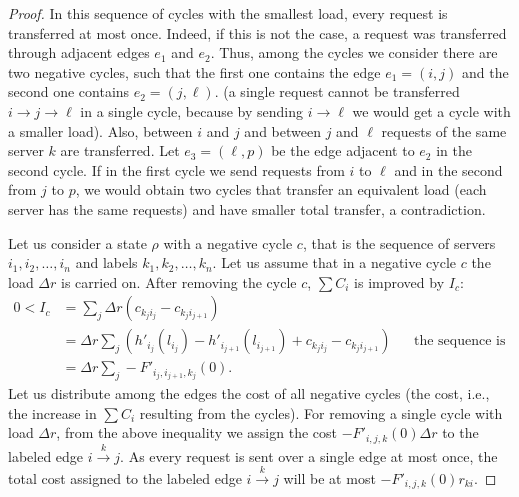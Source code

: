 \documentclass[11pt]{article}
\begin{document}
\begin{proof}
In this sequence of cycles with the smallest load, every request is transferred at most once.
Indeed, if this is not the case, a request was transferred through adjacent edges $e_1$ and $e_2$. Thus, among the cycles we consider there are two negative cycles, such that the first one contains the edge $e_1 = (i, j)$ and the second one contains $e_2 = (j, \ell)$. 
(a single request cannot be transferred $i \to j \to \ell$ in a single cycle, because by sending $i \to \ell$ we would get a cycle with a smaller load).
Also, between $i$ and $j$ and between $j$ and $\ell$ requests of the same server $k$ are transferred. Let $e_3 = (\ell, p)$ be the edge adjacent to $e_2$ in the second cycle.
If in the first cycle we send requests from $i$ to $\ell$ and in the second from $j$ to $p$, we would obtain two cycles that transfer an equivalent load (each server has the same requests) and have
smaller total transfer, a contradiction.




Let us consider a state $\rho$ with a negative cycle $c$, that is the sequence of servers $i_{1}, i_{2}, \ldots, i_{n}$ and labels $k_{1}, k_{2}, \ldots, k_{n}$. Let us assume that in a negative cycle $c$ the load $\Delta r$ is carried on. After removing the cycle $c$, $\sum{C_i}$ is improved by $I_{c}$:
\begin{align*}
0 < I_{c} &= \sum_{j} \Delta r \left(c_{k_j i_{j}} - c_{k_j i_{j+1}}\right) \\
          &= \Delta r \sum_{j} \left(h'_{i_j}(l_{i_j}) - h'_{i_{j+1}}(l_{i_{j+1}}) + c_{k_j i_{j}} - c_{k_j i_{j+1}}\right) && \text{the sequence is a cycle}\\
          &= \Delta r \sum_{j} -F'_{i_j, i_{j+1}, k_j}(0) \text{.}
\end{align*}
Let us distribute among the edges the cost of all negative cycles (the cost, i.e., the increase in $\sum C_i$ resulting from the cycles). For removing a single cycle with load $\Delta r$, from the above inequality we assign the cost $-F'_{i, j, k}(0)\Delta r$ to the labeled edge $i \xrightarrow{k} j$. As every request is sent over a single edge at most once, the total cost assigned to the labeled edge $i \xrightarrow{k} j$ will be at most $-F'_{i, j, k}(0) r_{ki}$. 


\end{proof}
\end{document}
